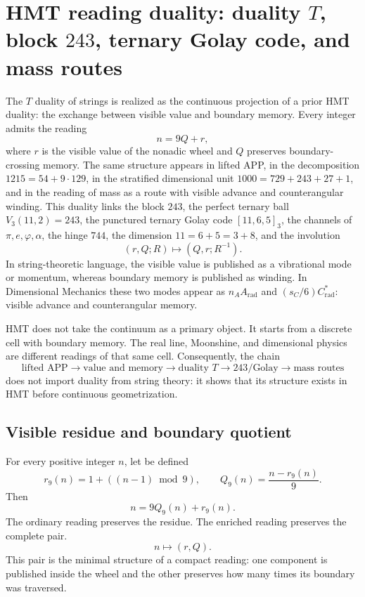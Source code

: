 \section{HMT reading duality: duality \texorpdfstring{\(T\)}{T}, block \texorpdfstring{\(243\)}{243}, ternary Golay code, and mass routes}
\label{sec:sucesor83-f083-dualidad-t}

The \(T\) duality of strings is realized as the continuous projection of a
prior HMT duality: the exchange between visible value and boundary
memory. Every integer admits the reading
\[
n=9Q+r,
\]
where \(r\) is the visible value of the nonadic wheel and \(Q\) preserves
boundary-crossing memory. The same structure appears in lifted APP,
in the decomposition \(1215=54+9\cdot129\), in the stratified dimensional
unit \(1000=729+243+27+1\), and in the reading of mass as a route with
visible advance and counterangular winding. This duality links the block
\(243\), the perfect ternary ball \(V_3(11,2)=243\), the punctured ternary
Golay code \([11,6,5]_3\), the channels of
\(\pi,e,\varphi,\alpha\), the hinge \(744\), the dimension
\(11=6+5=3+8\), and the involution
\[
(r,Q;R)\longmapsto(Q,r;R^{-1}).
\]
In string-theoretic language, the visible value is published as a vibrational mode or
momentum, whereas boundary memory is published as winding.
In Dimensional Mechanics these two modes appear as
\(n_AA_{\mathrm{rad}}\) and \((s_C/6)C^*_{\mathrm{rad}}\): visible advance and
counterangular memory.

HMT does not take the continuum as a primary object. It starts from a discrete cell
with boundary memory. The real line, Moonshine, and dimensional physics are
different readings of that same cell. Consequently, the chain
\[
\text{lifted APP}
\longrightarrow\text{value and memory}
\longrightarrow\text{duality }T
\longrightarrow243/\text{Golay}
\longrightarrow\text{mass routes}
\]
does not import duality from string theory: it shows that its structure
exists in HMT before continuous geometrization.

\subsection{Visible residue and boundary quotient}

For every positive integer \(n\), let be defined
\[
r_9(n)=1+((n-1)\bmod 9),
\qquad
Q_9(n)=\frac{n-r_9(n)}{9}.
\]
Then
\[
n=9Q_9(n)+r_9(n).
\]
The ordinary reading preserves the residue. The enriched reading preserves the complete pair.
\[
n\longmapsto(r,Q).
\]
This pair is the minimal structure of a compact reading: one component is
published inside the wheel and the other preserves how many times its
boundary was traversed.

